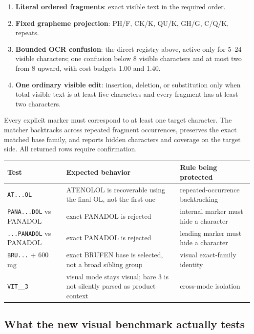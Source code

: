 \documentclass[10pt,a4paper]{article}
\newcommand{\observed}[1]{\texttt{#1}}
\begin{document}
\begin{enumerate}
\item \textbf{Literal ordered fragments}: exact visible text in the required order.
\item \textbf{Fixed grapheme projection}: PH/F, CK/K, QU/K, GH/G, C/Q/K, repeats.
\item \textbf{Bounded OCR confusion}: the direct registry above, active only
for 5--24 visible characters; one confusion below 8 visible characters and at
most two from 8 upward, with cost budgets 1.00 and 1.40.
\item \textbf{One ordinary visible edit}: insertion, deletion, or substitution
only when total visible text is at least five characters and every fragment
has at least two characters.
\end{enumerate}

Every explicit marker must correspond to at least one target character. The
matcher backtracks across repeated fragment occurrences, preserves the exact
matched base family, and reports hidden characters and coverage on the target
side. All returned rows require confirmation.

\begin{tabularx}{\textwidth}{@{}L{42mm}L{50mm}Y@{}}
\toprule
Test & Expected behavior & Rule being protected \\
\midrule
\observed{AT...OL} & ATENOLOL is recoverable using the final OL, not the first one & repeated-occurrence backtracking \\
\observed{PANA...DOL} vs PANADOL & exact PANADOL is rejected & internal marker must hide a character \\
\observed{...PANADOL} vs PANADOL & exact PANADOL is rejected & leading marker must hide a character \\
\observed{BRU...} + 600 mg & exact BRUFEN base is selected, not a broad sibling group & visual exact-family identity \\
\observed{VIT\_\_3} & visual mode stays visual; bare 3 is not silently parsed as product context & cross-mode isolation \\
\end{tabularx}

\subsection{What the new visual benchmark actually tests}\label{sec:visual-benchmark}
\end{document}
